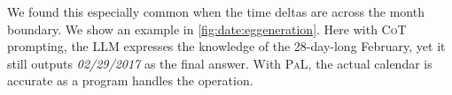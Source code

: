 \documentclass[dvipsnames]{article} \usepackage[accepted]{icml2022}
\newcommand{\ours}{\textsc{PaL}\xspace}
\newcommand{\cotp}{\textsc{CoT}\xspace}
\newcommand{\llm}{LLM\xspace}
\begin{document}
We found this especially common when the time deltas are across the month boundary.
We show an example in \autoref{fig:date:eggeneration}. Here with \cotp prompting, the \llm expresses the knowledge of the 28-day-long February, yet it still outputs \textit{02/29/2017} as the final answer. 
With \ours, the actual calendar is accurate as a program handles the operation.
  
\end{document}
